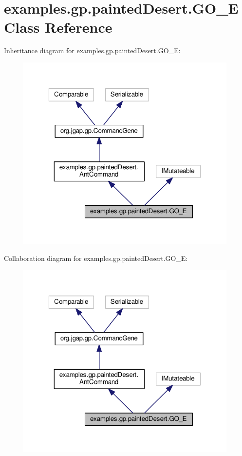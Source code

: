 \hypertarget{classexamples_1_1gp_1_1painted_desert_1_1_g_o___e}{\section{examples.\-gp.\-painted\-Desert.\-G\-O\-\_\-\-E Class Reference}
\label{classexamples_1_1gp_1_1painted_desert_1_1_g_o___e}
}


Inheritance diagram for examples.\-gp.\-painted\-Desert.\-G\-O\-\_\-\-E\-:
\nopagebreak
\begin{figure}[H]
\begin{center}
\leavevmode
\includegraphics[width=313pt]{classexamples_1_1gp_1_1painted_desert_1_1_g_o___e__inherit__graph}
\end{center}
\end{figure}


Collaboration diagram for examples.\-gp.\-painted\-Desert.\-G\-O\-\_\-\-E\-:
\nopagebreak
\begin{figure}[H]
\begin{center}
\leavevmode
\includegraphics[width=313pt]{classexamples_1_1gp_1_1painted_desert_1_1_g_o___e__coll__graph}
\end{center}
\end{figure}
